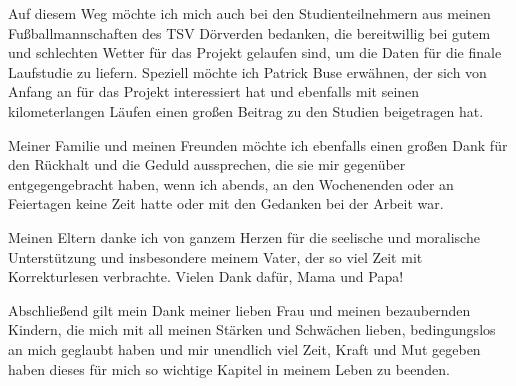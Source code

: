 Auf diesem Weg möchte ich mich auch bei den Studienteilnehmern aus meinen Fußballmannschaften des TSV Dörverden bedanken, die bereitwillig bei gutem und schlechten Wetter für das Projekt gelaufen sind, um die Daten für die finale Laufstudie zu liefern. Speziell möchte ich Patrick Buse erwähnen, der sich von Anfang an für das Projekt interessiert hat und ebenfalls mit seinen kilometerlangen Läufen einen großen Beitrag zu den Studien beigetragen hat.

Meiner Familie und meinen Freunden möchte ich ebenfalls einen großen Dank für den Rückhalt und die Geduld aussprechen, die sie mir gegenüber entgegengebracht haben, wenn ich abends, an den Wochenenden oder an Feiertagen keine Zeit hatte oder mit den Gedanken bei der Arbeit war. 

Meinen Eltern danke ich von ganzem Herzen für die seelische und moralische Unterstützung und insbesondere meinem Vater, der so viel Zeit mit Korrekturlesen verbrachte. Vielen Dank dafür, Mama und Papa! 

Abschließend gilt mein Dank meiner lieben Frau und meinen bezaubernden Kindern, die mich mit all meinen Stärken und Schwächen lieben, bedingungslos an mich geglaubt haben und mir unendlich viel Zeit, Kraft und Mut gegeben haben dieses für mich so wichtige Kapitel in meinem Leben zu beenden. 